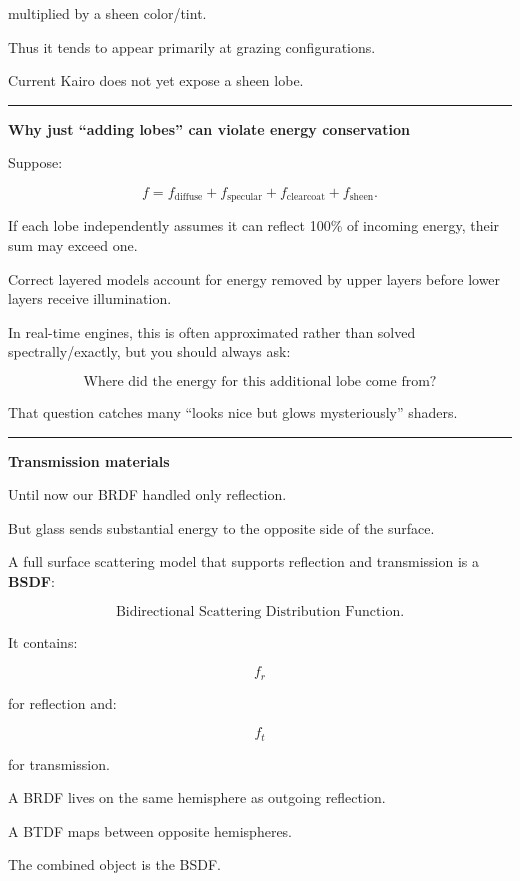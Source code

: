 multiplied by a sheen color/tint.

Thus it tends to appear primarily at grazing configurations.

Current Kairo does not yet expose a sheen lobe.

\begin{center}\rule{0.5\linewidth}{0.5pt}\end{center}

\textbf{Why just ``adding lobes'' can violate energy conservation}

Suppose:

\[
f=
f_{\text{diffuse}}
+
f_{\text{specular}}
+
f_{\text{clearcoat}}
+
f_{\text{sheen}}.
\]

If each lobe independently assumes it can reflect 100\% of incoming energy, their sum may exceed one.

Correct layered models account for energy removed by upper layers before lower layers receive illumination.

In real-time engines, this is often approximated rather than solved spectrally/exactly, but you should always ask:

\[
\boxed{
\text{Where did the energy for this additional lobe come from?}
}
\]

That question catches many ``looks nice but glows mysteriously'' shaders.

\begin{center}\rule{0.5\linewidth}{0.5pt}\end{center}

\textbf{Transmission materials}

Until now our BRDF handled only reflection.

But glass sends substantial energy to the opposite side of the surface.

A full surface scattering model that supports reflection and transmission is a \textbf{BSDF}:

\[
\text{Bidirectional Scattering Distribution Function}.
\]

It contains:

\[
f_r
\]

for reflection and:

\[
f_t
\]

for transmission.

A BRDF lives on the same hemisphere as outgoing reflection.

A BTDF maps between opposite hemispheres.

The combined object is the BSDF.

